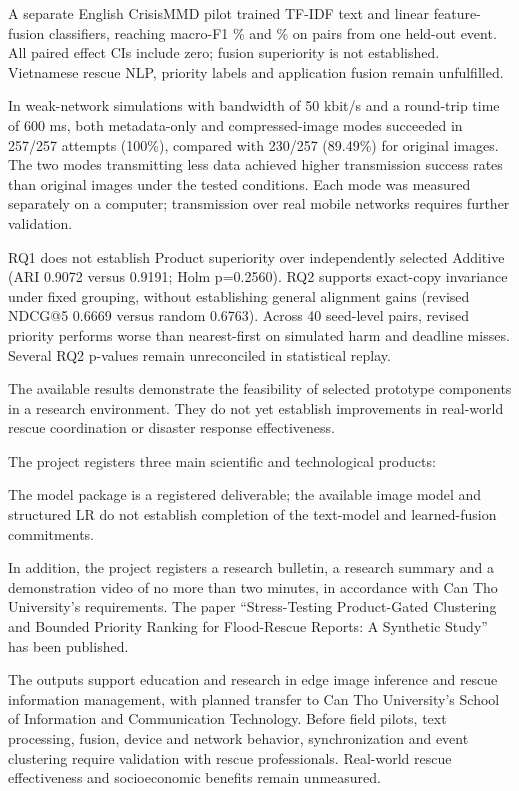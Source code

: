 A separate English CrisisMMD pilot trained TF-IDF text and linear feature-fusion classifiers, reaching macro-F1 \MMTextFOne\% and \MMFusionFOne\% on \MMTestN{} pairs from one held-out event. All paired effect CIs include zero; fusion superiority is not established. Vietnamese rescue NLP, priority labels and application fusion remain unfulfilled.

In weak-network simulations with bandwidth of 50 kbit/s and a round-trip time of 600 ms, both metadata-only and compressed-image modes succeeded in 257/257 attempts (100\%), compared with 230/257 (89.49\%) for original images. The two modes transmitting less data achieved higher transmission success rates than original images under the tested conditions. Each mode was measured separately on a computer; transmission over real mobile networks requires further validation.

RQ1 does not establish Product superiority over independently selected Additive (ARI 0.9072 versus 0.9191; Holm p=0.2560). RQ2 supports exact-copy invariance under fixed grouping, without establishing general alignment gains (revised NDCG@5 0.6669 versus random 0.6763). Across 40 seed-level pairs, revised priority performs worse than nearest-first on simulated harm and deadline misses. Several RQ2 p-values remain unreconciled in statistical replay.

The available results demonstrate the feasibility of selected prototype components in a research environment. They do not yet establish improvements in real-world rescue coordination or disaster response effectiveness.

The project registers three main scientific and technological products:
\par\noindent The model package is a registered deliverable; the available image model and structured LR do not establish completion of the text-model and learned-fusion commitments.
\par\noindent In addition, the project registers a research bulletin, a research summary and a demonstration video of no more than two minutes, in accordance with Can Tho University's requirements. The paper ``Stress-Testing Product-Gated Clustering and Bounded Priority Ranking for Flood-Rescue Reports: A Synthetic Study'' has been published.

The outputs support education and research in edge image inference and rescue information management, with planned transfer to Can Tho University's School of Information and Communication Technology. Before field pilots, text processing, fusion, device and network behavior, synchronization and event clustering require validation with rescue professionals. Real-world rescue effectiveness and socioeconomic benefits remain unmeasured.
